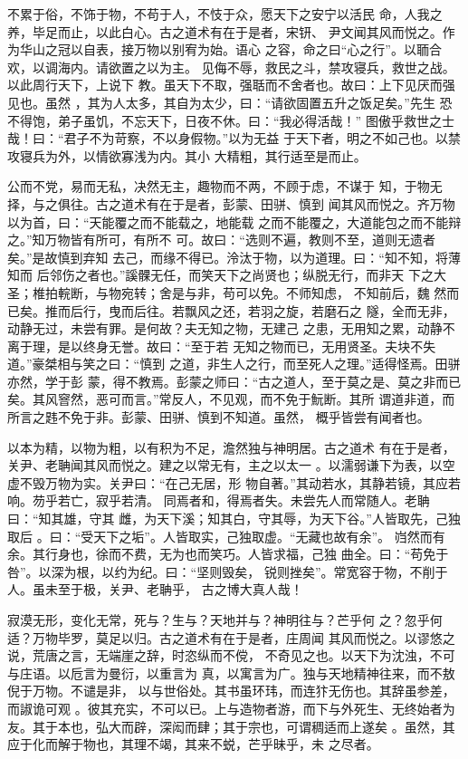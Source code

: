 \documentclass[a4paper,12pt,UTF8,twoside]{ctexbook}
\begin{document}
不累于俗，不饰于物，不苟于人，不忮于众，愿天下之安宁以活民 命，人我之养，毕足而止，以此白心。古之道术有在于是者，宋钘、 尹文闻其风而悦之。作为华山之冠以自表，接万物以别宥为始。语心 之容，命之曰“心之行”。以聏合欢，以调海内。请欲置之以为主。 见侮不辱，救民之斗，禁攻寝兵，救世之战。以此周行天下，上说下 教。虽天下不取，强聒而不舍者也。故曰：上下见厌而强见也。虽然 ，其为人太多，其自为太少，曰：“请欲固置五升之饭足矣。”先生 恐不得饱，弟子虽饥，不忘天下，日夜不休。曰：“我必得活哉！” 图傲乎救世之士哉！曰：“君子不为苛察，不以身假物。”以为无益 于天下者，明之不如己也。以禁攻寝兵为外，以情欲寡浅为内。其小 大精粗，其行适至是而止。

公而不党，易而无私，决然无主，趣物而不两，不顾于虑，不谋于 知，于物无择，与之俱往。古之道术有在于是者，彭蒙、田骈、慎到 闻其风而悦之。齐万物以为首，曰：“天能覆之而不能载之，地能载 之而不能覆之，大道能包之而不能辩之。”知万物皆有所可，有所不 可。故曰：“选则不遍，教则不至，道则无遗者矣。”是故慎到弃知 去己，而缘不得已。泠汰于物，以为道理。曰：“知不知，将薄知而 后邻伤之者也。”謑髁无任，而笑天下之尚贤也；纵脱无行，而非天 下之大圣；椎拍輐断，与物宛转；舍是与非，苟可以免。不师知虑， 不知前后，魏 然而已矣。推而后行，曳而后往。若飘风之还，若羽之旋，若磨石之 隧，全而无非，动静无过，未尝有罪。是何故？夫无知之物，无建己 之患，无用知之累，动静不离于理，是以终身无誉。故曰：“至于若 无知之物而已，无用贤圣。夫块不失道。”豪桀相与笑之曰：“慎到 之道，非生人之行，而至死人之理。”适得怪焉。田骈亦然，学于彭 蒙，得不教焉。彭蒙之师曰：“古之道人，至于莫之是、莫之非而已 矣。其风窨然，恶可而言。”常反人，不见观，而不免于魭断。其所 谓道非道，而所言之韪不免于非。彭蒙、田骈、慎到不知道。虽然， 概乎皆尝有闻者也。

以本为精，以物为粗，以有积为不足，澹然独与神明居。古之道术 有在于是者，关尹、老聃闻其风而悦之。建之以常无有，主之以太一 。以濡弱谦下为表，以空虚不毁万物为实。关尹曰：“在己无居，形 物自著。”其动若水，其静若镜，其应若响。芴乎若亡，寂乎若清。 同焉者和，得焉者失。未尝先人而常随人。老聃曰：“知其雄，守其 雌，为天下溪；知其白，守其辱，为天下谷。”人皆取先，己独取后 。曰：“受天下之垢”。人皆取实，己独取虚。“无藏也故有余”。 岿然而有余。其行身也，徐而不费，无为也而笑巧。人皆求福，己独 曲全。曰：“苟免于咎”。以深为根，以约为纪。曰：“坚则毁矣， 锐则挫矣”。常宽容于物，不削于人。虽未至于极，关尹、老聃乎， 古之博大真人哉！

寂漠无形，变化无常，死与？生与？天地并与？神明往与？芒乎何 之？忽乎何适？万物毕罗，莫足以归。古之道术有在于是者，庄周闻 其风而悦之。以谬悠之说，荒唐之言，无端崖之辞，时恣纵而不傥， 不奇见之也。以天下为沈浊，不可与庄语。以卮言为曼衍，以重言为 真，以寓言为广。独与天地精神往来，而不敖倪于万物。不谴是非， 以与世俗处。其书虽环玮，而连犿无伤也。其辞虽参差，而諔诡可观 。彼其充实，不可以已。上与造物者游，而下与外死生、无终始者为 友。其于本也，弘大而辟，深闳而肆；其于宗也，可谓稠适而上遂矣 。虽然，其应于化而解于物也，其理不竭，其来不蜕，芒乎昧乎，未 之尽者。
\end{document}

